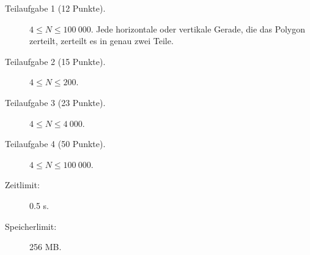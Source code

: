 \documentclass{boi2014-de}
\begin{document}
    \begin{description}
        \item[Teilaufgabe 1 (12 Punkte).] $4 \le N \le 100\ 000$.
        Jede horizontale oder vertikale Gerade, die das Polygon zerteilt, zerteilt es in genau zwei Teile.        
        \item[Teilaufgabe 2 (15 Punkte).] $4 \le N \le 200$.
        \item[Teilaufgabe 3 (23 Punkte).] $4 \le N \le 4\ 000$.
        \item[Teilaufgabe 4 (50 Punkte).] $4 \le N \le 100\ 000$.
    \end{description}

    \Constraints

    \begin{description}
        \item[Zeitlimit:] 0.5 s.
        \item[Speicherlimit:] 256 MB.
    \end{description}
\end{document}
